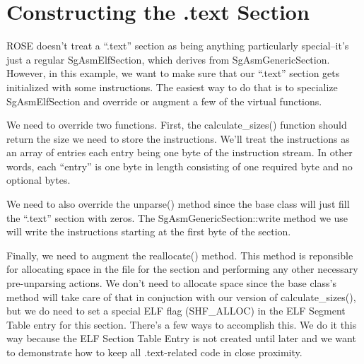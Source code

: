 \section{Constructing the .text Section}

ROSE doesn't treat a ``.text'' section as being anything particularly
special--it's just a regular SgAsmElfSection, which derives from
SgAsmGenericSection. However, in this example, we want to make sure
that our ``.text'' section gets initialized with some
instructions. The easiest way to do that is to specialize
SgAsmElfSection and override or augment a few of the virtual
functions.

We need to override two functions. First, the calculate\_sizes()
function should return the size we need to store the
instructions. We'll treat the instructions as an array of entries each
entry being one byte of the instruction stream. In other words, each
``entry'' is one byte in length consisting of one required byte and no
optional bytes.

We need to also override the unparse() method since the base class
will just fill the ``.text'' section with zeros. The
SgAsmGenericSection::write method we use will write the instructions
starting at the first byte of the section.

Finally, we need to augment the reallocate() method. This method is
reponsible for allocating space in the file for the section and
performing any other necessary pre-unparsing actions. We don't need to
allocate space since the base class's method will take care of that in
conjuction with our version of calculate\_sizes(), but we do need to
set a special ELF flag (SHF\_ALLOC) in the ELF Segment Table entry for
this section. There's a few ways to accomplish this. We do it this way
because the ELF Section Table Entry is not created until later and we
want to demonstrate how to keep all .text-related code in close
proximity.

